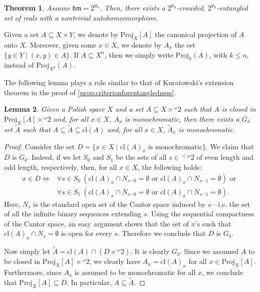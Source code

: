\documentclass[12pt]{amsart}
\newtheorem{theorem}{Theorem}[section]
\newtheorem{lemma}[theorem]{Lemma}
\theoremstyle{definition}
\theoremstyle{remark}
\begin{document}
\begin{theorem}\label{thm:2s}
Assume $\mathfrak{hm} = 2^{\aleph_0}$. Then, there exists a $2^{\aleph_0}$-crowded, $2^{\aleph_0}$-entangled set of reals with a nontrivial autohomeomorphism.
\end{theorem}

Given a set $A\subseteq X\times Y$, we denote by $\mathrm{Proj}_X[A]$ the canonical projection of $A$ onto $X$. Moreover, given some $x \in X$, we denote by $A_x$ the set $\{y \in Y \mid (x,y) \in A\}$. If $A \subseteq X^n$, then we simply write $\mathrm{Proj}_k(A)$, with $k \le n$, instead of $\mathrm{Proj}_{X^k}(A)$. 

The following lemma plays a role similar to that of Kuratowski's extension theorem in the proof of \cref{prop:criterionforentangledness}.

\begin{lemma}\label{lemma:extension}
Given a Polish space $X$ and a set $A\subseteq X \times {}^\omega 2$ such that $A$ is closed in $\mathrm{Proj}_X[A]\times {}^\omega 2$ and, for all $x \in X$, $A_x$ is monochromatic, then there exists a $G_\delta$ set $\tilde{A}$ such that $A \subseteq \tilde{A} \subseteq \mathrm{cl}(A)$ and, for all $x \in X$, $\tilde{A}_x$ is monochromatic.
\end{lemma}
\begin{proof}
Consider the set $D = \{x \in X \mid \mathrm{cl}(A)_x \text{ is monochromatic}\}$. We claim that $D$ is $G_\delta$. Indeed, if we let $S_0$ and $S_1$ be the sets of all $s \in {}^{<\omega}2$ of even length and odd length, respectively, then, for all $x \in X$, the following holds:
\begin{align*}
x \in D \iff& \forall s \in S_0 \ (\mathrm{cl}(A)_x \cap N_{s^\smallfrown 0} = \emptyset \text{ or } \mathrm{cl}(A)_x \cap N_{s^\smallfrown 1} = \emptyset) \text{ or }\\& \forall s \in S_1 \ (\mathrm{cl}(A)_x \cap N_{s^\smallfrown 0} = \emptyset \text{ or } \mathrm{cl}(A)_x \cap N_{s^\smallfrown 1} = \emptyset).
\end{align*}
Here, $N_s$ is the standard open set of the Cantor space induced by $s$---i.e. the set of all the infinite binary sequences extending $s$. Using the sequential compactness of the Cantor space, an easy argument shows that the set of $x$'s such that $\mathrm{cl}(A)_x \cap N_{s} = \emptyset$ is open for every $s$. Therefore we conclude that $D$ is $G_\delta$.

Now simply let $\tilde{A} = \mathrm{cl}(A) \cap (D \times {}^\omega 2)$. It is clearly $G_\delta$. Since we assumed $A$ to be closed in $\mathrm{Proj}_X[A]\times {}^\omega 2$, we clearly have $A_x = \mathrm{cl}(A)_x$ for all $x \in \mathrm{Proj}_X[A]$. Furthermore, since $A_x$ is assumed to be monochromatic for all $x$, we conclude that $\mathrm{Proj}_X[A] \subseteq D$. In particular, $A \subseteq \tilde{A}$. 
\end{proof}
\end{document}
